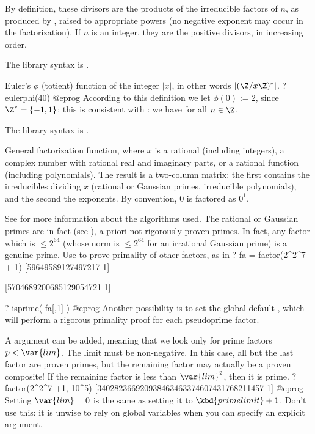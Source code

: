 By definition, these divisors are the products of the irreducible
factors of $n$, as produced by , raised to appropriate
powers (no negative exponent may occur in the factorization). If $n$ is
an integer, they are the positive divisors, in increasing order.

The library syntax is .

\label{se:eulerphi}
Euler's $\phi$ (totient) function of the
integer $|x|$, in other words $|(\Z/x\Z)^*|$.
\bprog
? eulerphi(40)
@eprog\noindent
According to this definition we let $\phi(0) := 2$, since $\Z^* = \{-1,1\}$;
this is consistent with : we have  for all $n\in\Z$.

The library syntax is .

\label{se:factor}
General factorization function, where $x$ is a
rational (including integers), a complex number with rational
real and imaginary parts, or a rational function (including polynomials).
The result is a two-column matrix: the first contains the irreducibles
dividing $x$ (rational or Gaussian primes, irreducible polynomials),
and the second the exponents. By convention, $0$ is factored as $0^1$.

See  for more information about the algorithms used.
The rational or Gaussian primes are in fact 
(see ), a priori not rigorously proven primes. In fact,
any factor which is $\leq 2^{64}$ (whose norm is $\leq 2^{64}$ for an
irrational Gaussian prime) is a genuine prime. Use  to prove
primality of other factors, as in
\bprog
? fa = factor(2^2^7 + 1)
[59649589127497217 1]

[5704689200685129054721 1]

? isprime( fa[,1] )
@eprog\noindent
Another possibility is to set the global default , which
will perform a rigorous primality proof for each pseudoprime factor.

A  argument  can be added, meaning that we look only for
prime factors $p < \var{lim}$. The limit  must be non-negative.
In this case, all but the last factor are proven primes, but the remaining
factor may actually be a proven composite! If the remaining factor is less
than $\var{lim}^2$, then it is prime.
\bprog
? factor(2^2^7 +1, 10^5)
[340282366920938463463374607431768211457 1]
@eprog\noindent
{} Setting $\var{lim}=0$ is the same
as setting it to $\kbd{primelimit} + 1$. Don't use this: it is unwise to
rely on global variables when you can specify an explicit argument.
\smallskip

